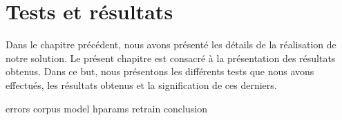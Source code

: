 \chapter{Tests et résultats}%
\label{chap.results}

Dans le chapitre précédent, nous avons présenté les détails de la réalisation de notre solution.
Le présent chapitre est consacré à la présentation des résultats obtenus.
Dans ce but, nous présentons les différents tests que nous avons effectués,
les résultats obtenus et la signification de ces derniers.

{errors}
{corpus}
{model}
{hparams}
{retrain}
{conclusion}